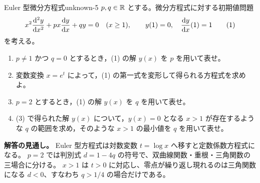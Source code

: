 \begin{problem}{Euler 型微分方程式}{unknown-5}
$p,q\in\mathbb{R}$ とする。微分方程式に対する初期値問題
\[
x^2\frac{\mathrm{d}^2y}{\mathrm{d} x^2}+px\frac{\mathrm{d} y}{\mathrm{d} x}+qy=0\quad(x\ge1),
\qquad
y(1)=0,\quad \frac{\mathrm{d} y}{\mathrm{d} x}(1)=1
\tag{1}
\]
を考える。
\begin{enumerate}
  \item[(1)] $p\ne1$ かつ $q=0$ とするとき，(1) の解 $y(x)$ を $p$ を用いて表せ。
  \item[(2)] 変数変換 $x=e^t$ によって，(1) の第一式を変形して得られる方程式を求めよ。
  \item[(3)] $p=2$ とするとき，(1) の解 $y(x)$ を $q$ を用いて表せ。
  \item[(4)] (3) で得られた解 $y(x)$ について，$y(x)=0$ となる $x>1$ が存在するような $q$ の範囲を求め，そのような $x>1$ の最小値を $q$ を用いて表せ。
\end{enumerate}
\end{problem}
\begin{memo*}
\textbf{解答の見通し。}
Euler 型方程式は対数変数 $t=\log x$ へ移すと定数係数方程式になる。
$p=2$ では判別式 $d=1-4q$ の符号で、双曲線関数・重根・三角関数の三場合に分ける。
$x>1$ は $t>0$ に対応し、零点が繰り返し現れるのは三角関数になる
$d<0$、すなわち $q>1/4$ の場合だけである。
\end{memo*}
